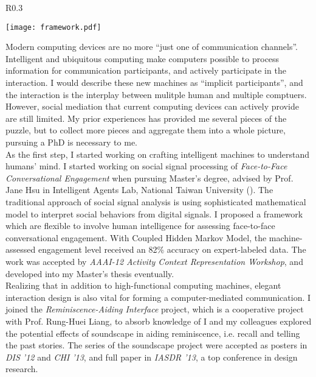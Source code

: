 \begin{wrapfigure}{R}{0.3\textwidth}
  \begin{center}
  \texttt{[image: framework.pdf]}
  \caption{}
  \label{fig:framework}
  \end{center}
\end{wrapfigure}

\noindent
Modern computing devices are no more ``just one of communication channels''.
Intelligent and ubiquitous computing make computers possible to process information for communication participants,
and actively participate in the interaction.
I would describe these new machines as ``implicit participants'',
and the interaction is the interplay between mulitple human and multiple comptuers.
However, social mediation that current computing devices can actively provide are still limited.
My prior experiences has provided me several pieces of the puzzle,
but to collect more pieces and aggregate them into a whole picture, 
pursuing a PhD is necessary to me.\\

\noindent
As the first step, I started working on crafting intelligent machines to understand humans' mind.
I started working on social signal processing of \textit{Face-to-Face Conversational Engagement} when pursuing Master's degree,
advised by Prof. Jane Hsu in Intelligent Agents Lab, National Taiwan University ().
The traditional approach of social signal analysis is using sophisticated mathematical model to interpret social behaviors from digital signals.
I proposed a framework which are flexible to involve human intelligence for assessing face-to-face conversational engagement.
With Coupled Hidden Markov Model, 
the machine-assessed engagement level received an 82\% accuracy on expert-labeled data. 
The work was accepted by \textit{AAAI-12 Activity Context Representation Workshop}, and developed into my Master's thesis eventually.\\

\noindent
Realizing that in addition to high-functional computing machines, 
elegant interaction design is also vital for forming a computer-mediated communication.
I joined the \textit{Reminiscence-Aiding Interface} project, 
which is a cooperative project with Prof. Rung-Huei Liang,
to absorb knowledge of  
I and my colleagues explored the potential effects of soundscape in aiding reminiscence,
i.e. recall and telling the past stories.
The series of the soundscape project were accepted as posters in \textit{DIS '12} and \textit{CHI '13}, 
and full paper in \textit{IASDR '13}, a top conference in design research.\\

